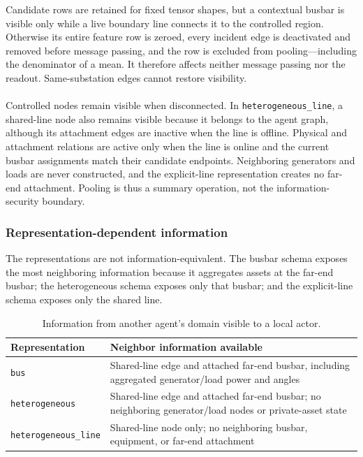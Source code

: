 Candidate rows are retained for fixed tensor shapes, but a contextual busbar
is visible only while a live boundary line connects it to the controlled
region. Otherwise its entire feature row is zeroed, every incident edge is
deactivated and removed before message passing, and the row is excluded from
pooling---including the denominator of a mean. It therefore affects neither
message passing nor the readout. Same-substation edges cannot restore
visibility.
\\
\\
Controlled nodes remain visible when disconnected. In
\texttt{heterogeneous\_line}, a shared-line node also remains visible because
it belongs to the agent graph, although its attachment edges are inactive when
the line is offline. Physical and attachment relations are active only when
the line is online and the current busbar assignments match their candidate
endpoints. Neighboring generators and loads are never constructed, and the
explicit-line representation creates no far-end attachment. Pooling is thus a
summary operation, not the information-security boundary.

\subsubsection{Representation-dependent information}

The representations are not information-equivalent. The busbar schema exposes
the most neighboring information because it aggregates assets at the far-end
busbar; the heterogeneous schema exposes only that busbar; and the
explicit-line schema exposes only the shared line.

\begin{table}[H]
  \centering
  \small
  \caption{Information from another agent's domain visible to a local actor.}
  \label{tab:local-information-boundary}
  \setlength{\tabcolsep}{4pt}
  \begin{tabular}{L{0.24\textwidth}L{0.64\textwidth}}
    \toprule
    Representation & Neighbor information available \\
    \midrule
    \texttt{bus} & Shared-line edge and attached far-end busbar, including aggregated generator/load power and angles \\
    \texttt{heterogeneous} & Shared-line edge and attached far-end busbar; no neighboring generator/load nodes or private-asset state \\
    \texttt{heterogeneous\_line} & Shared-line node only; no neighboring busbar, equipment, or far-end attachment \\
    \bottomrule
  \end{tabular}
\end{table}

